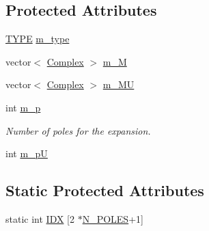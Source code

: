 \subsection*{Protected Attributes}
\begin{DoxyCompactItemize}
\item 
\hyperlink{classCMCoeff_a0b490eeb5ba86bc1a95ea1c3b2946478}{T\-Y\-P\-E} \hyperlink{classCMCoeff_afe0cd2c61d33f32a058302fb53c33ccf}{m\-\_\-type}
\item 
vector$<$ \hyperlink{util_8h_a0ef19d29521fc1e3356ea268ba175cfc}{Complex} $>$ \hyperlink{classCMCoeff_a15347641cc66b95ff56bea89f4585edf}{m\-\_\-\-M}
\item 
vector$<$ \hyperlink{util_8h_a0ef19d29521fc1e3356ea268ba175cfc}{Complex} $>$ \hyperlink{classCMCoeff_a2fc4617b2a37d2ca033aea2f5e02b5de}{m\-\_\-\-M\-U}
\item 
int \hyperlink{classCMCoeff_adf49f0bd55b7c496b887f547695aba38}{m\-\_\-p}
\begin{DoxyCompactList}\small\item\em Number of poles for the expansion. \end{DoxyCompactList}\item 
int \hyperlink{classCMCoeff_ac00d5938d669575bf71826ee725ccf46}{m\-\_\-p\-U}
\end{DoxyCompactItemize}
\subsection*{Static Protected Attributes}
\begin{DoxyCompactItemize}
\item 
static int \hyperlink{classCMCoeff_ab1882e6a0df777b1acffadf55844dc92}{I\-D\-X} \mbox{[}2 $\ast$\hyperlink{mcoeff_8h_ac23f9c13c5d07d9ce386f7a830c35e5a}{N\-\_\-\-P\-O\-L\-E\-S}+1\mbox{]}
\end{DoxyCompactItemize}
